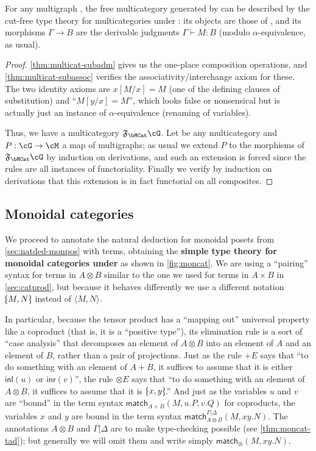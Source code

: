 \documentclass{book}
\let\types\vdash
\newcommand{\F}[1]{\mathfrak{F}_{#1}}
\def\pair#1#2{\langle #1,#2\rangle}
\def\plusE{\mathord{+}E}
\def\inl{\mathsf{inl}}
\def\inr{\mathsf{inr}}
\def\acase#1#2{\mathsf{match}_{#1+#2}}
\def\match{\mathsf{match}}
\let\tensor\otimes
\def\tensorE{\mathord{\tensor}E}
\def\tpair#1#2{\text{\textlquill} #1,#2 \text{\textrquill}}%
\begin{document}
\begin{thm}\label{thm:multicat-initial}
  For any multigraph \cG, the free multicategory generated by \cG can be described by the cut-free type theory for multicategories under \cG: its objects are those of \cG, and its morphisms $\Gamma\to B$ are the derivable judgments $\Gamma\types M:B$ (modulo $\alpha$-equivalence, as usual).
\end{thm}
\begin{proof}
  \cref{thm:multicat-subadm} gives us the one-place composition operations, and \cref{thm:multicat-subassoc} verifies the associativity/interchange axiom for these.
  The two identity axioms are $x[M/x]=M$ (one of the defining clauses of substitution) and ``$M[y/x] = M$'', which looks false or nonsensical but is actually just an instance of $\alpha$-equivalence (renaming of variables).

  Thus, we have a multicategory $\F\bMCat\cG$.
  Let \cM be any multicategory and $P:\cG\to\cM$ a map of multigraphs; as usual we extend $P$ to the morphisms of $\F\bMCat\cG$ by induction on derivations, and such an extension is forced since the rules are all instances of functoriality.
  Finally we verify by induction on derivations that this extension is in fact functorial on all composites.
\end{proof}


\subsection{Monoidal categories}
\label{sec:moncat}

We proceed to annotate the natural deduction for monoidal posets from \cref{sec:natded-monpos} with terms, obtaining the \textbf{simple type theory for monoidal categories under \cG} as shown in \cref{fig:moncat}.
We are using a ``pairing'' syntax for terms in $A\tensor B$ similar to the one we used for terms in $A\times B$ in \cref{sec:catprod}, but because it behaves differently we use a different notation $\tpair M N$ instead of $\pair M N$.

In particular, because the tensor product has a ``mapping out'' universal property like a coproduct (that is, it is a ``positive type''), its elimination rule is a sort of ``case analysis'' that decomposes an element of $A\tensor B$ into an element of $A$ and an element of $B$, rather than a pair of projections.
Just as the rule $\plusE$ says that ``to do something with an element of $A+B$, it suffices to assume that it is either $\inl(u)$ or $\inr(v)$'', the rule $\tensorE$ says that ``to do something with an element of $A\tensor B$, it suffices to assume that it is $\tpair{x}{y}$.''
And just as the variables $u$ and $v$ are ``bound'' in the term syntax $\acase AB(M,u.P,v.Q)$ for coproducts, the variables $x$ and $y$ are bound in the term syntax $\match_{A\tensor B}^{\Gamma|\Delta}(M,xy.N)$.
The annotations $A\tensor B$ and $\Gamma|\Delta$ are to make type-checking possible (see \cref{thm:moncat-tad}); but generally we will omit them and write simply $\match_\tensor(M,xy.N)$.
\end{document}

